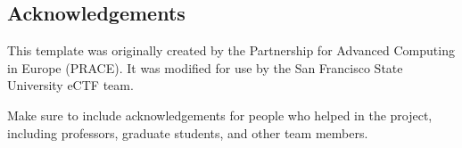 \documentclass{prace}
\begin{document}
\subsection*{Acknowledgements}
This template was originally created by the Partnership for Advanced Computing
in Europe (PRACE). It was modified for use by the San Francisco State University
eCTF team.

Make sure to include acknowledgements for people who helped in the project,
including professors, graduate students, and other team members.

\end{document}
